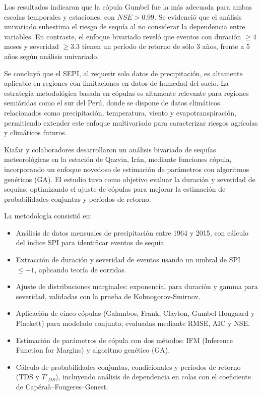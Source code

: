 Los resultados indicaron que la cópula Gumbel fue la más adecuada para ambas escalas temporales y estaciones, con $NSE > 0.99$. Se evidenció que el análisis univariado subestima el riesgo de sequía al no considerar la dependencia entre variables. En contraste, el enfoque bivariado reveló que eventos con duración $\geq 4$ meses y severidad $\geq 3.3$ tienen un período de retorno de sólo 3 años, frente a 5 años según análisis univariado.

Se concluyó que el SEPI, al requerir solo datos de precipitación, es altamente aplicable en regiones con limitaciones en datos de humedad del suelo. La estrategia metodológica basada en cópulas es altamente relevante para regiones semiáridas como el sur del Perú, donde se dispone de datos climáticos relacionados como precipitación, temperatura, viento y evapotranspiración, permitiendo extender este enfoque multivariado para caracterizar riesgos agrícolas y climáticos futuros.



Kiafar y colaboradores \textcite{Kiafar2020} desarrollaron un análisis bivariado de sequías meteorológicas en la estación de Qazvin, Irán, mediante funciones cópula, incorporando un enfoque novedoso de estimación de parámetros con algoritmos genéticos (GA). El estudio tuvo como objetivo evaluar la duración y severidad de sequías, optimizando el ajuste de cópulas para mejorar la estimación de probabilidades conjuntas y períodos de retorno.

La metodología consistió en:
\begin{itemize}
    \item Análisis de datos mensuales de precipitación entre 1964 y 2015, con cálculo del índice SPI para identificar eventos de sequía.
    \item Extracción de duración y severidad de eventos usando un umbral de SPI $\leq -1$, aplicando teoría de corridas.
    \item Ajuste de distribuciones marginales: exponencial para duración y gamma para severidad, validadas con la prueba de Kolmogorov-Smirnov.
    \item Aplicación de cinco cópulas (Galambos, Frank, Clayton, Gumbel-Hougaard y Plackett) para modelado conjunto, evaluadas mediante RMSE, AIC y NSE.
    \item Estimación de parámetros de cópula con dos métodos: IFM (Inference Function for Margins) y algoritmo genético (GA).
    \item Cálculo de probabilidades conjuntas, condicionales y períodos de retorno (TDS y $T'_{DS}$), incluyendo análisis de dependencia en colas con el coeficiente de Capéraà–Fougeres–Genest.
\end{itemize}

